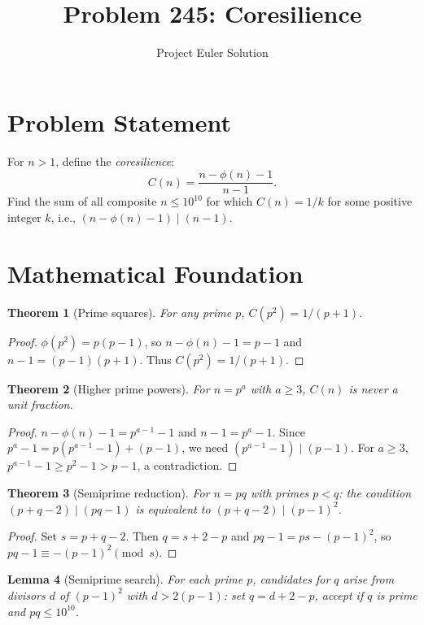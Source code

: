 \documentclass[12pt]{article}
\title{Problem 245: Coresilience}
\author{Project Euler Solution}
\date{}
\newtheorem{theorem}{Theorem}
\newtheorem{lemma}[theorem]{Lemma}
\begin{document}
\maketitle

\section{Problem Statement}

For $n>1$, define the \emph{coresilience}:
\[
C(n)=\frac{n-\phi(n)-1}{n-1}.
\]
Find the sum of all composite $n\le 10^{10}$ for which $C(n)=1/k$ for some positive integer $k$, i.e., $(n-\phi(n)-1)\mid(n-1)$.

\section{Mathematical Foundation}

\begin{theorem}[Prime squares]\label{thm:p2}
For any prime $p$, $C(p^2)=1/(p+1)$.
\end{theorem}

\begin{proof}
$\phi(p^2)=p(p-1)$, so $n-\phi(n)-1=p-1$ and $n-1=(p-1)(p+1)$. Thus $C(p^2)=1/(p+1)$.
\end{proof}

\begin{theorem}[Higher prime powers]\label{thm:pa}
For $n=p^a$ with $a\ge 3$, $C(n)$ is never a unit fraction.
\end{theorem}

\begin{proof}
$n-\phi(n)-1=p^{a-1}-1$ and $n-1=p^a-1$. Since $p^a-1=p(p^{a-1}-1)+(p-1)$, we need $(p^{a-1}-1)\mid(p-1)$. For $a\ge 3$, $p^{a-1}-1\ge p^2-1>p-1$, a contradiction.
\end{proof}

\begin{theorem}[Semiprime reduction]\label{thm:semi}
For $n=pq$ with primes $p<q$: the condition $(p+q-2)\mid(pq-1)$ is equivalent to $(p+q-2)\mid(p-1)^2$.
\end{theorem}

\begin{proof}
Set $s=p+q-2$. Then $q=s+2-p$ and $pq-1=ps-(p-1)^2$, so $pq-1\equiv -(p-1)^2\pmod{s}$.
\end{proof}

\begin{lemma}[Semiprime search]\label{lem:search}
For each prime $p$, candidates for $q$ arise from divisors $d$ of $(p-1)^2$ with $d>2(p-1)$: set $q=d+2-p$, accept if $q$ is prime and $pq\le 10^{10}$.
\end{lemma}
\end{document}
